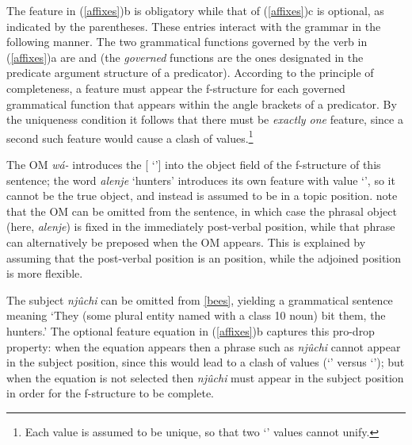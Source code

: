 \eal 
 \label{affixes}
 \zl 
 
\noindent
The  feature in (\ref{affixes})b is obligatory while that of (\ref{affixes})c is optional, as indicated by the parentheses.  These entries interact with the grammar in the following manner.  The two grammatical functions governed by the verb in (\ref{affixes})a are  and  (the \textit{governed} functions are the ones designated in the predicate argument structure of a predicator).  According to the principle of completeness, a  feature must appear the f-structure for each governed grammatical function that appears within the angle brackets of a predicator.  By the uniqueness condition it follows that there must be \textit{exactly one}  feature, since a second such feature would cause a clash of values.\footnote{Each  value is assumed to be unique, so that two `' values cannot unify.}  

The OM {\it w\'{a}-} introduces the [ `'] into the object field of the f-structure of this sentence; the word \textit{alenje} `hunters' introduces its own  feature with value `', so it cannot be the true object, and instead is assumed to be in a topic position.  \citet{bresnan+mchombo:1987} note that the OM can be omitted from the sentence, in which case the phrasal object (here, \textit{alenje}) is fixed in the immediately post-verbal position, while that phrase can alternatively be preposed when the OM appears.  This is explained by assuming that the post-verbal position is an  position, while the adjoined  position is more flexible.  

The subject \textit{nj\^{u}chi} can be omitted from \ref{bees}, yielding a grammatical sentence meaning `They (some plural entity named with a class 10 noun) bit them, the hunters.'  The optional  feature equation in (\ref{affixes})b captures this pro-drop property: when the equation appears then a phrase such as \textit{nj\^{u}chi} cannot appear in the subject position, since this would lead to a clash of  values 
(`' versus `'); but when the equation is not selected then  \textit{nj\^{u}chi} must appear in the subject position in order for the f-structure to be complete.  

